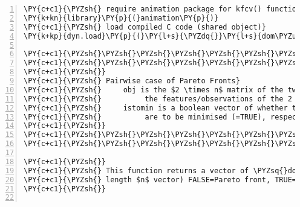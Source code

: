\begin{Verbatim}[commandchars=\\\{\},codes={\catcode`\$=3\catcode`\^=7\catcode`\_=8},gobble=0,numbers=left,fontfamily=fvm,fontshape=n,fontsize=\footnotesize,tabsize=2]
\PY{c+c1}{\PYZsh{} require animation package for kfcv() function}
\PY{k+kn}{library}\PY{p}{(}animation\PY{p}{)}
\PY{c+c1}{\PYZsh{} load compiled C code (shared object)}
\PY{k+kp}{dyn.load}\PY{p}{(}\PY{l+s}{\PYZdq{}}\PY{l+s}{dom\PYZus{}feat.so\PYZdq{}}\PY{p}{)}

\PY{c+c1}{\PYZsh{}\PYZsh{}\PYZsh{}\PYZsh{}\PYZsh{}\PYZsh{}\PYZsh{}\PYZsh{}\PYZsh{}\PYZsh{}\PYZsh{}\PYZsh{}\PYZsh{}\PYZsh{}\PYZsh{}\PYZsh{}\PYZsh{}\PYZsh{}\PYZsh{}\PYZsh{}\PYZsh{}\PYZsh{}\PYZsh{}\PYZsh{}\PYZsh{}\PYZsh{}\PYZsh{}\PYZsh{}\PYZsh{}\PYZsh{}\PYZsh{}\PYZsh{}\PYZsh{}\PYZsh{}\PYZsh{}\PYZsh{}\PYZsh{}\PYZsh{}\PYZsh{}\PYZsh{}\PYZsh{}\PYZsh{}}
\PY{c+c1}{\PYZsh{}\PYZsh{}\PYZsh{}\PYZsh{}\PYZsh{}\PYZsh{}\PYZsh{}\PYZsh{}\PYZsh{}\PYZsh{}\PYZsh{}\PYZsh{}\PYZsh{}\PYZsh{}\PYZsh{}\PYZsh{}\PYZsh{}\PYZsh{}\PYZsh{}\PYZsh{}\PYZsh{}\PYZsh{}\PYZsh{}\PYZsh{}\PYZsh{}\PYZsh{}\PYZsh{}\PYZsh{}\PYZsh{}\PYZsh{}\PYZsh{}\PYZsh{}\PYZsh{}\PYZsh{}\PYZsh{}\PYZsh{}\PYZsh{}\PYZsh{}\PYZsh{}\PYZsh{}\PYZsh{}\PYZsh{}}
\PY{c+c1}{\PYZsh{}}
\PY{c+c1}{\PYZsh{} Pairwise case of Pareto Fronts}
\PY{c+c1}{\PYZsh{}     obj is the $2 \times n$ matrix of the two vectors of length $n$ for  }
\PY{c+c1}{\PYZsh{}			the features/observations of the 2 criteria/objective functions}
\PY{c+c1}{\PYZsh{}     istomin is a boolean vector of whether the criteria obj$_1$, obj$_2$  }
\PY{c+c1}{\PYZsh{}			are to be minimised (=TRUE), respectively}
\PY{c+c1}{\PYZsh{}}
\PY{c+c1}{\PYZsh{}\PYZsh{}\PYZsh{}\PYZsh{}\PYZsh{}\PYZsh{}\PYZsh{}\PYZsh{}\PYZsh{}\PYZsh{}\PYZsh{}\PYZsh{}\PYZsh{}\PYZsh{}\PYZsh{}\PYZsh{}\PYZsh{}\PYZsh{}\PYZsh{}\PYZsh{}\PYZsh{}\PYZsh{}\PYZsh{}\PYZsh{}\PYZsh{}\PYZsh{}\PYZsh{}\PYZsh{}\PYZsh{}\PYZsh{}\PYZsh{}\PYZsh{}\PYZsh{}\PYZsh{}\PYZsh{}\PYZsh{}\PYZsh{}\PYZsh{}\PYZsh{}\PYZsh{}\PYZsh{}\PYZsh{}}
\PY{c+c1}{\PYZsh{}\PYZsh{}\PYZsh{}\PYZsh{}\PYZsh{}\PYZsh{}\PYZsh{}\PYZsh{}\PYZsh{}\PYZsh{}\PYZsh{}\PYZsh{}\PYZsh{}\PYZsh{}\PYZsh{}\PYZsh{}\PYZsh{}\PYZsh{}\PYZsh{}\PYZsh{}\PYZsh{}\PYZsh{}\PYZsh{}\PYZsh{}\PYZsh{}\PYZsh{}\PYZsh{}\PYZsh{}\PYZsh{}\PYZsh{}\PYZsh{}\PYZsh{}\PYZsh{}\PYZsh{}\PYZsh{}\PYZsh{}\PYZsh{}\PYZsh{}\PYZsh{}\PYZsh{}\PYZsh{}\PYZsh{}}

\PY{c+c1}{\PYZsh{}}
\PY{c+c1}{\PYZsh{} This function returns a vector of \PYZsq{}dominated\PYZsq{} observations (Boolean, }
\PY{c+c1}{\PYZsh{} length $n$ vector) FALSE=Pareto front, TRUE=dominated observation}
\PY{c+c1}{\PYZsh{}}


\end{Verbatim}
